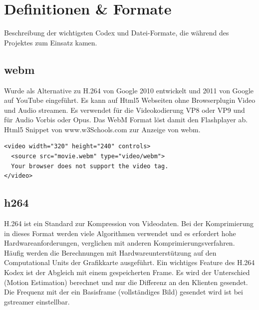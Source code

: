 \section{Definitionen \& Formate}
Beschreibung der wichtigsten Codex und Datei-Formate, die während des Projektes zum Einsatz kamen.

\subsection{webm}
Wurde als Alternative zu H.264 von Google 2010 entwickelt und 2011 von Google auf YouTube eingeführt. Es kann auf Html5 Webseiten ohne Browserplugin Video und Audio streamen. Es verwendet für die Videokodierung VP8 oder VP9 und für Audio Vorbis oder Opus. Das WebM Format löst damit den Flashplayer ab.\\

Html5 Snippet von www.w3Schools.com zur Anzeige von webm.
\begin{verbatim}
<video width="320" height="240" controls>
  <source src="movie.webm" type="video/webm">
  Your browser does not support the video tag.
</video> 
\end{verbatim}

\subsection{h264}
H.264 ist ein Standard zur Kompression von Videodaten. Bei der Komprimierung in dieses Format werden viele Algorithmen verwendet und es erfordert hohe Hardwareanforderungen, verglichen mit anderen Komprimierungsverfahren. Häufig werden die Berechnungen mit Hardwareunterstützung auf den Computational Units der Grafikkarte ausgeführt. Ein wichtiges Feature des H.264 Kodex ist der Abgleich mit einem gespeicherten Frame. Es wird der Unterschied (Motion Estimation) berechnet und nur die Differenz an den Klienten gesendet. Die Frequenz mit der ein Basisframe (vollständiges Bild) gesendet wird ist bei gstreamer einstellbar.\\

